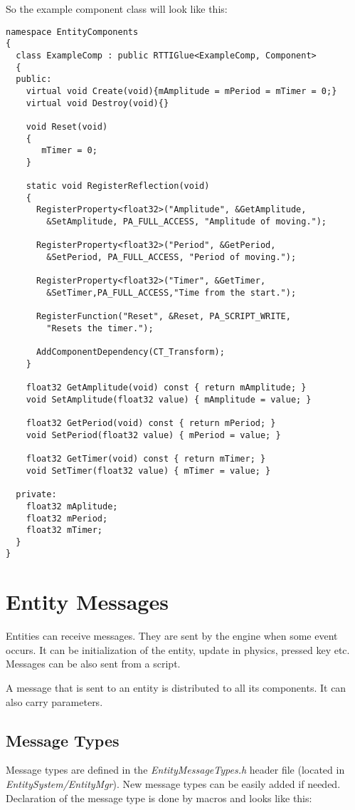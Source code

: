 \documentclass[a4paper, 12pt]{report}
\begin{document}
So the example component class will look like this: 

\begin{verbatim}
namespace EntityComponents
{
  class ExampleComp : public RTTIGlue<ExampleComp, Component>
  {
  public:
    virtual void Create(void){mAmplitude = mPeriod = mTimer = 0;}
    virtual void Destroy(void){}

    void Reset(void)
    {
       mTimer = 0;
    }

    static void RegisterReflection(void)
    {
      RegisterProperty<float32>("Amplitude", &GetAmplitude,
        &SetAmplitude, PA_FULL_ACCESS, "Amplitude of moving.");

      RegisterProperty<float32>("Period", &GetPeriod, 
        &SetPeriod, PA_FULL_ACCESS, "Period of moving.");

      RegisterProperty<float32>("Timer", &GetTimer, 
        &SetTimer,PA_FULL_ACCESS,"Time from the start.");

      RegisterFunction("Reset", &Reset, PA_SCRIPT_WRITE,
        "Resets the timer.");

      AddComponentDependency(CT_Transform);
    }

    float32 GetAmplitude(void) const { return mAmplitude; }
    void SetAmplitude(float32 value) { mAmplitude = value; }
		
    float32 GetPeriod(void) const { return mPeriod; }
    void SetPeriod(float32 value) { mPeriod = value; }
		
    float32 GetTimer(void) const { return mTimer; }
    void SetTimer(float32 value) { mTimer = value; }

  private:
    float32 mAplitude;
    float32 mPeriod;
    float32 mTimer;
  }
}
\end{verbatim}

\section{Entity Messages}

Entities can receive messages. They are sent by the engine when some event occurs. It can be initialization of the entity, update in physics, pressed key etc. Messages can be also sent from a script.

A message that is sent to an entity is distributed to all its components. It can also carry parameters.

\subsection{Message Types}
Message types are defined in the \emph{EntityMessageTypes.h} header file (located in \emph{EntitySystem/EntityMgr}). New message types can be easily added if needed. Declaration of the message type is done by macros and looks like this:
\end{document}
